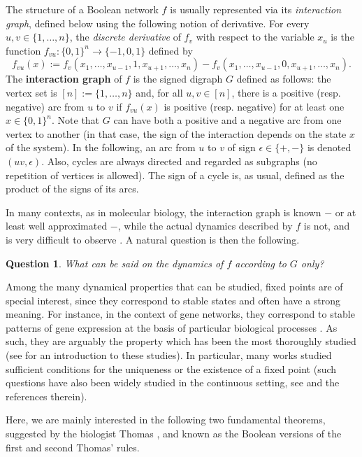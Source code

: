 \documentclass[11pt,a4paper]{article}
\newtheorem{question}{Question}
\def\B{\{0,1\}}
\def\e{\epsilon}
\begin{document}
\medskip
The structure of a Boolean network $f$ is usually represented via its {\em interaction graph}, defined below using the following notion of derivative. For every $u,v\in\{1,\dots,n\}$, the {\em discrete derivative} of $f_v$ with respect to the variable $x_u$ is the function $f_{vu}:\B^n\to\{-1,0,1\}$ defined by 
\[
f_{vu}(x):=f_v(x_1,\dots,x_{u-1},1,x_{u+1},\dots,x_n)-f_v(x_1,\dots,x_{u-1},0,x_{u+1},\dots,x_n).
\]
The {\bf interaction graph} of $f$ is the signed digraph $G$ defined as follows: the vertex set is $[n]:=\{1,\dots,n\}$ and, for all $u,v\in[n]$, there is a positive (resp. negative) arc from $u$ to $v$ if $f_{vu}(x)$ is positive (resp. negative) for at least one $x\in\B^n$. Note that $G$ can have both a positive and a negative arc from one vertex to another (in that case, the sign of the interaction depends on the state $x$ of the system). In the following, an arc from $u$ to $v$ of sign $\e\in\{+,-\}$ is denoted $(uv,\e)$. Also, cycles are always directed and regarded as subgraphs (no repetition of vertices is allowed). The sign of a cycle is, as usual, defined as the product of the signs of its arcs.
 
\medskip 
In many contexts, as in molecular biology, the interaction graph is known $-$ or at least well
approximated $-$, while the actual dynamics described by $f$ is not, and is very difficult to observe \cite{TK01,N15}. A natural question is then the following. 

\begin{question}\label{question} 
What can be said on the dynamics of $f$ according to $G$ only? 
\end{question}

Among the many dynamical properties that can be studied, fixed points are of special interest, since they correspond to stable states and often have a strong meaning. For instance, in the context of gene networks, they correspond to stable patterns of gene expression at the basis of particular biological processes \cite{TA90,A04}. As such, they are arguably the property which has been the most thoroughly studied (see \cite{R86} for an introduction to these studies). In particular, many works studied sufficient conditions for the uniqueness or the existence of a fixed point \cite{SD05,A08,RRT08,RC07,R10,R15} (such questions have also been widely studied in the continuous setting, see \cite{KST07} and the references therein). 

\medskip
Here, we are mainly interested in the following two fundamental theorems, suggested by the biologist Thomas \cite{T81}, and known as the Boolean versions of the first and second Thomas' rules.
\end{document}
